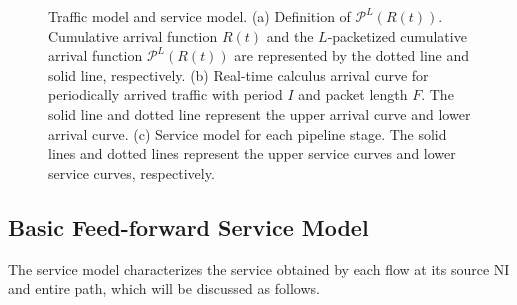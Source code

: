 \documentclass[preprint]{elsarticle}
\begin{document}
\begin{figure}
  \caption{Traffic model and service model. (a) Definition of $\mathcal{P}^L(R(t))$. Cumulative arrival function $R(t)$ and the $L$-packetized cumulative arrival function $\mathcal{P}^L(R(t))$ are represented by the dotted line and solid line, respectively. (b) Real-time calculus arrival curve for periodically arrived traffic with period $I$ and packet length $F$. The solid line and dotted line represent the upper arrival curve and lower arrival curve. (c) Service model for each pipeline stage. The solid lines and dotted lines represent the upper service curves and lower service curves, respectively.}\label{ac}
\end{figure}

\subsection{Basic Feed-forward Service Model}\label{sm}
The service model characterizes the service obtained by each flow at its source NI and entire path, which will be discussed as follows.
\end{document}
